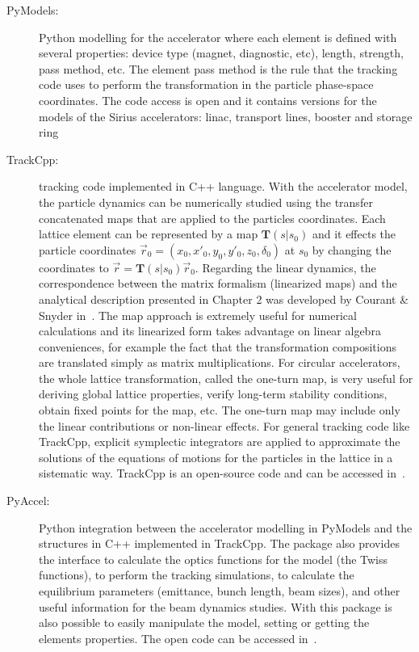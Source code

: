 \begin{description}
    \item[PyModels:] Python modelling for the accelerator where each element is defined with several properties: device type (magnet, diagnostic, etc), length, strength, pass method, etc. The element pass method is the rule that the tracking code uses to perform the transformation in the particle phase-space coordinates. The code access is open and it contains versions for the models of the Sirius accelerators: \gls{linac}, transport lines, booster and storage ring~\cite{pymodels}
    \item[TrackCpp:] tracking code implemented in C++ language. With the accelerator model, the particle dynamics can be numerically studied using the transfer concatenated maps that are applied to the particles coordinates. Each lattice element can be represented by a map $\mathbf{T}(s|s_0)$ and it effects the particle coordinates $\vec{r}_0 = \left(x_0, x'_0, y_0, y'_0, z_0, \delta_0\right)$ at $s_0$ by changing the coordinates to $\vec{r} = \mathbf{T}(s|s_0)\vec{r}_0$. Regarding the linear dynamics, the correspondence between the matrix formalism (linearized maps) and the analytical description presented in Chapter 2 was developed by Courant \& Snyder in~\cite{CourantSnyder1958}. The map approach is extremely useful for numerical calculations and its linearized form takes advantage on linear algebra conveniences, for example the fact that the transformation compositions are translated simply as matrix multiplications. For circular accelerators, the whole lattice transformation, called the one-turn map, is very useful for deriving global lattice properties, verify long-term stability conditions, obtain fixed points for the map, etc. The one-turn map may include only the linear contributions or non-linear effects. For general tracking code like TrackCpp, explicit symplectic integrators are applied to approximate the solutions of the equations of motions for the particles in the lattice in a sistematic way. TrackCpp is an open-source code and can be accessed in~\cite{trackcpp}.
    \item[PyAccel:] Python integration between the accelerator modelling in PyModels and the structures in C++ implemented in TrackCpp. The package also provides the interface to calculate the optics functions for the model (the Twiss functions), to perform the tracking simulations, to calculate the equilibrium parameters (emittance, bunch length, beam sizes), and other useful information for the beam dynamics studies. With this package is also possible to easily manipulate the model, setting or getting the elements properties. The open code can be accessed in~\cite{pyaccel}.
\end{description}

